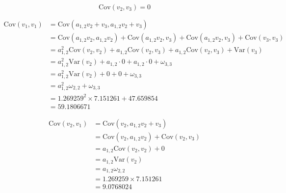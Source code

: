 \documentclass[
]{book}
\begin{document}
\begin{equation}
  \mathrm{Cov}
  \left(
    v_2,
    v_3
  \right)
  =
  0
\end{equation}

\begin{equation}
  \begin{split}
    \mathrm{Cov} \left( v_1, v_1 \right)
    &=
    \mathrm{Cov}
    \left(
      a_{1, 2} v_2 + v_3,
      a_{1, 2} v_2 + v_3
    \right) \\
    &=
    \mathrm{Cov} \left( a_{1, 2} v_2, a_{1, 2} v_2 \right)
    +
    \mathrm{Cov} \left( a_{1, 2} v_2, v_3 \right)
    +
    \mathrm{Cov} \left( a_{1, 2} v_2, v_3 \right)
    +
    \mathrm{Cov} \left( v_3, v_3 \right) \\
    &=
    a_{1, 2}^{2} \mathrm{Cov} \left( v_2, v_2 \right)
    +
    a_{1, 2} \mathrm{Cov} \left( v_2, v_3 \right)
    +
    a_{1, 2} \mathrm{Cov} \left( v_2, v_3 \right)
    +
    \mathrm{Var} \left( v_3 \right) \\
    &=
    a_{1, 2}^{2} \mathrm{Var} \left( v_2 \right)
    +
    a_{1, 2} \cdot 0
    +
    a_{1, 2} \cdot 0
    +
    \omega_{3, 3} \\
    &=
    a_{1, 2}^{2} \mathrm{Var} \left( v_2 \right)
    +
    0
    +
    0
    +
    \omega_{3, 3} \\
    &=
    a_{1, 2}^{2} \omega_{2, 2} + \omega_{3, 3} \\
    &=
    1.269259^{2} \times 7.151261 + 47.659854 \\
    &=
    59.1806671
  \end{split}
\end{equation}

\begin{equation}
  \begin{split}
    \mathrm{Cov} \left( v_2, v_1 \right)
    &=
    \mathrm{Cov} \left( v_2, a_{1, 2} v_2 + v_3 \right) \\
    &=
    \mathrm{Cov} \left( v_2, a_{1, 2} v_2 \right)
    +
    \mathrm{Cov} \left( v_2, v_3 \right) \\
    &=
    a_{1, 2} \mathrm{Cov} \left( v_2, v_2 \right)
    +
    0 \\
    &=
    a_{1, 2} \mathrm{Var} \left( v_2 \right) \\
    &=
    a_{1, 2} \omega_{2, 2} \\
    &=
    1.269259 \times 7.151261 \\ 
    &=
    9.0768024 \\ 
  \end{split}
\end{equation}
\end{document}
